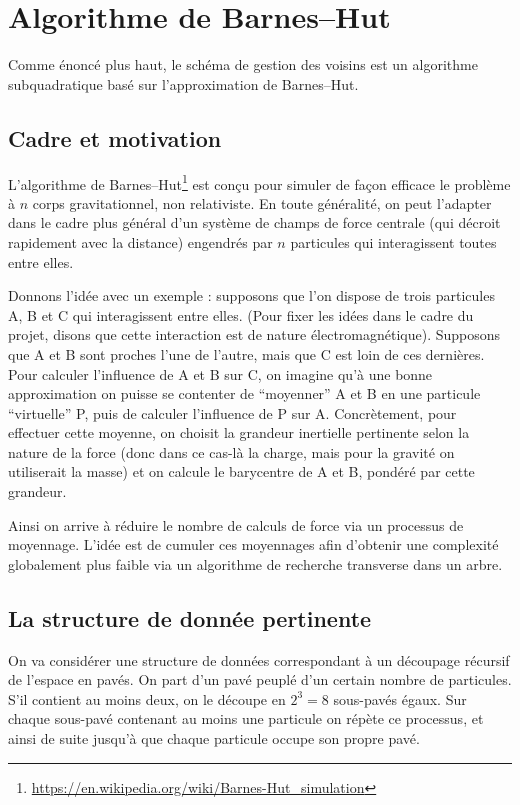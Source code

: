 \documentclass[12pt, letterpaper, twoside]{article}
\begin{document}
\section{Algorithme de Barnes--Hut}
\noindent Comme énoncé plus haut, le schéma de gestion des voisins est un algorithme subquadratique basé sur l'approximation de Barnes--Hut.
\subsection*{Cadre et motivation}
\noindent L'algorithme de Barnes--Hut\footnote{\url{https://en.wikipedia.org/wiki/Barnes-Hut_simulation}} est conçu pour simuler de façon efficace le problème à $n$ corps gravitationnel, non relativiste. En toute généralité, on peut l'adapter dans le cadre plus général d'un système de champs de force centrale (qui décroit rapidement avec la distance) engendrés par $n$ particules qui interagissent toutes entre elles.

Donnons l'idée avec un exemple : supposons que l'on dispose de trois particules A, B et C qui interagissent entre elles. (Pour fixer les idées dans le cadre du projet, disons que cette interaction est de nature électromagnétique). Supposons que A et B sont proches l'une de l'autre, mais que C est loin de ces dernières. Pour calculer l'influence de A et B sur C, on imagine qu'à une bonne approximation on puisse se contenter de ``moyenner'' A et B en une particule ``virtuelle'' P, puis de calculer l'influence de P sur A. Concrètement, pour effectuer cette moyenne, on choisit la grandeur inertielle pertinente selon la nature de la force (donc dans ce cas-là la charge, mais pour la gravité on utiliserait la masse) et on calcule le barycentre de A et B, pondéré par cette grandeur.

Ainsi on arrive à réduire le nombre de calculs de force via un processus de moyennage. L'idée est de cumuler ces moyennages afin d'obtenir une complexité globalement plus faible via un algorithme de recherche transverse dans un arbre.

\subsection*{La structure de donnée pertinente}
\noindent On va considérer une structure de données correspondant à un découpage récursif de l'espace en pavés. On part d'un pavé peuplé d'un certain nombre de particules. S'il contient au moins deux, on le découpe en $2^3 = 8$ sous-pavés égaux. Sur chaque sous-pavé contenant au moins une particule on répète ce processus, et ainsi de suite jusqu'à que chaque particule occupe son propre pavé.
\end{document}
